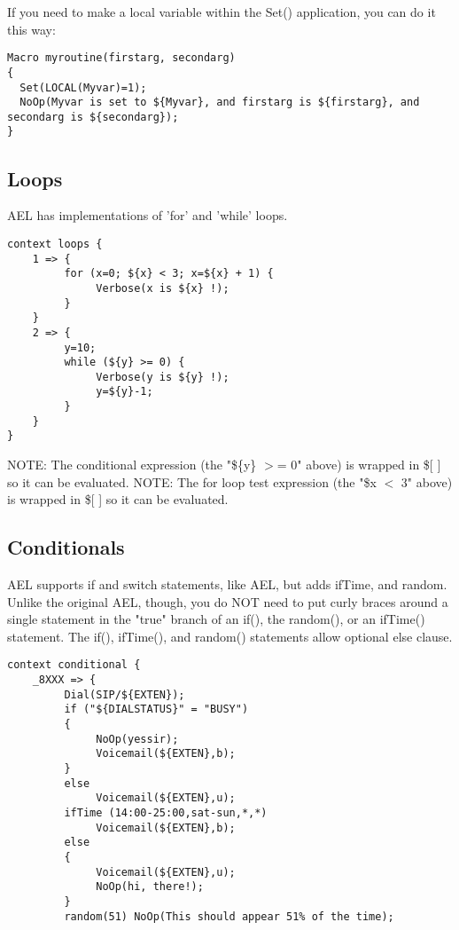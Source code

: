 {If you need to make a local variable within the Set() application, you can do it this way:
\begin{astlisting}
\begin{verbatim}
Macro myroutine(firstarg, secondarg)
{
  Set(LOCAL(Myvar)=1);
  NoOp(Myvar is set to ${Myvar}, and firstarg is ${firstarg}, and secondarg is ${secondarg});
}
\end{verbatim}
\end{astlisting}

\subsection{Loops}

AEL has implementations of 'for' and 'while' loops.
\begin{astlisting}
\begin{verbatim}
context loops {
    1 => {
         for (x=0; ${x} < 3; x=${x} + 1) {
              Verbose(x is ${x} !);
         }
    }
    2 => {
         y=10;
         while (${y} >= 0) {
              Verbose(y is ${y} !);
              y=${y}-1;
         }
    }
}
\end{verbatim}
\end{astlisting}

NOTE: The conditional expression (the "\$\{y\} $>$= 0" above) is wrapped in
      \$[ ] so it can be evaluated.  NOTE: The for loop test expression
      (the "\${x} $<$ 3" above) is wrapped in \$[ ] so it can be evaluated.



\subsection{Conditionals}

AEL supports if and switch statements, like AEL, but adds ifTime, and
random. Unlike the original AEL, though, you do NOT need to put curly
braces around a single statement in the "true" branch of an if(), the
random(), or an ifTime() statement. The if(), ifTime(), and random()
statements allow optional else clause.

\begin{astlisting}
\begin{verbatim}
context conditional {
    _8XXX => {
         Dial(SIP/${EXTEN});
         if ("${DIALSTATUS}" = "BUSY")
         {
              NoOp(yessir);
              Voicemail(${EXTEN},b);
         }
         else
              Voicemail(${EXTEN},u);
         ifTime (14:00-25:00,sat-sun,*,*)
              Voicemail(${EXTEN},b);
         else
         {
              Voicemail(${EXTEN},u);
              NoOp(hi, there!);
         }
         random(51) NoOp(This should appear 51% of the time);


\end{verbatim}
\end{astlisting}}
